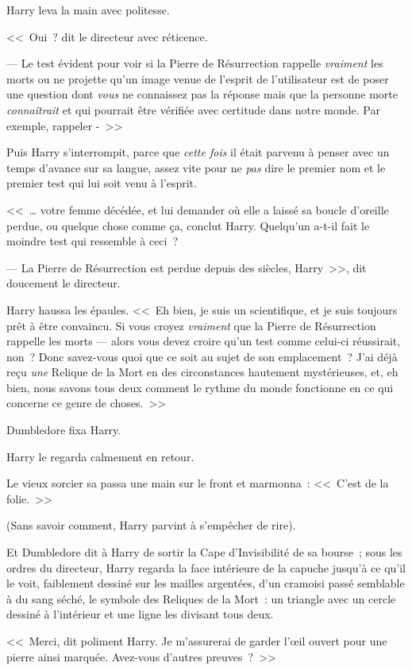 Harry leva la main avec politesse.

<<~Oui~? dit le directeur avec réticence.

--- Le test évident pour voir si la Pierre de Résurrection rappelle \emph{vraiment} les morts ou ne projette qu'un image venue de l'esprit de l'utilisateur est de poser une question dont \emph{vous} ne connaissez pas la réponse mais que la personne morte \emph{connaîtrait} et qui pourrait être vérifiée avec certitude dans notre monde. Par exemple, rappeler -~>>

Puis Harry s'interrompit, parce que \emph{cette fois} il était parvenu à penser avec un temps d'avance sur sa langue, assez vite pour ne \emph{pas} dire le premier nom et le premier test qui lui soit venu à l'esprit.

<<~… votre femme décédée, et lui demander où elle a laissé sa boucle d'oreille perdue, ou quelque chose comme ça, conclut Harry. Quelqu'un a-t-il fait le moindre test qui ressemble à ceci~?

--- La Pierre de Résurrection est perdue depuis des siècles, Harry~>>, dit doucement le directeur.

Harry haussa les épaules. <<~Eh bien, je suis un scientifique, et je suis toujours prêt à être convaincu. Si vous croyez \emph{vraiment} que la Pierre de Résurrection rappelle les morts — alors vous devez croire qu'un test comme celui-ci réussirait, non~? Donc savez-vous quoi que ce soit au sujet de son emplacement~? J'ai déjà reçu \emph{une} Relique de la Mort en des circonstances hautement mystérieuses, et, eh bien, nous savons tous deux comment le rythme du monde fonctionne en ce qui concerne ce genre de choses.~>>

Dumbledore fixa Harry.

Harry le regarda calmement en retour.

Le vieux sorcier sa passa une main sur le front et marmonna~: <<~C'est de la folie.~>>

(Sans savoir comment, Harry parvint à s'empêcher de rire).

Et Dumbledore dit à Harry de sortir la Cape d'Invisibilité de sa bourse~; sous les ordres du directeur, Harry regarda la face intérieure de la capuche jusqu'à ce qu'il le voit, faiblement dessiné sur les mailles argentées, d'un cramoisi passé semblable à du sang séché, le symbole des Reliques de la Mort~: un triangle avec un cercle dessiné à l'intérieur et une ligne les divisant tous deux.

<<~Merci, dit poliment Harry. Je m'assurerai de garder l'œil ouvert pour une pierre ainsi marquée. Avez-vous d'autres preuves~?~>>

